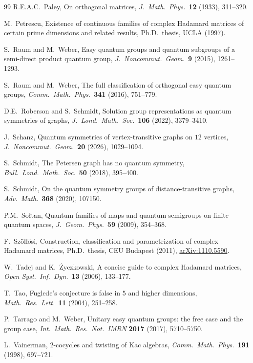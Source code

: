\documentclass[11pt]{amsart}
\theoremstyle{definition}
\theoremstyle{remark}
\theoremstyle{plain}
\numberwithin{equation}{section}
\numberwithin{table}{section}
\begin{document}
\begin{thebibliography}{99}
 R.E.A.C.~Paley, On orthogonal matrices, \emph{J.\ Math.\ Phys.}\ \textbf{12} (1933), 311--320.

 M.~Petrescu, Existence of continuous families of complex Hadamard matrices of certain prime dimensions and related results, Ph.D.\ thesis, UCLA (1997).

 S.~Raum and M.~Weber, Easy quantum groups and quantum subgroups of a semi-direct product quantum group, \emph{J.\ Noncommut.\ Geom.}\ \textbf{9} (2015), 1261--1293.

 S.~Raum and M.~Weber, The full classification of orthogonal easy quantum groups, \emph{Comm.\ Math.\ Phys.}\ \textbf{341} (2016), 751--779.

 D.E.~Roberson and S.~Schmidt, Solution group representations as quantum symmetries of graphs, \emph{J.\ Lond.\ Math.\ Soc.}\ \textbf{106} (2022), 3379--3410.

 J.~Schanz, Quantum symmetries of vertex-transitive graphs on $12$ vertices, \emph{J.\ Noncommut.\ Geom.}\ \textbf{20} (2026), 1029--1094.

 S.~Schmidt, The Petersen graph has no quantum symmetry, \emph{Bull.\ Lond.\ Math.\ Soc.}\ \textbf{50} (2018), 395--400.

 S.~Schmidt, On the quantum symmetry groups of distance-transitive graphs, \emph{Adv.\ Math.}\ \textbf{368} (2020), 107150.

 P.M.~So{\l}tan, Quantum families of maps and quantum semigroups on finite quantum spaces, \emph{J.\ Geom.\ Phys.}\ \textbf{59} (2009), 354--368.

 F.~Sz\"oll\H{o}si, Construction, classification and parametrization of complex Hadamard matrices, Ph.D.\ thesis, CEU Budapest (2011), \href{https://arxiv.org/pdf/1110.5590}{arXiv:1110.5590}.

 W.~Tadej and K.~\.{Z}yczkowski, A concise guide to complex Hadamard matrices, \emph{Open Syst.\ Inf.\ Dyn.}\ \textbf{13} (2006), 133--177.

 T.~Tao, Fuglede's conjecture is false in $5$ and higher dimensions, \emph{Math.\ Res.\ Lett.}\ \textbf{11} (2004), 251--258.

 P.~Tarrago and M.~Weber, Unitary easy quantum groups: the free case and the group case, \emph{Int.\ Math.\ Res.\ Not.\ IMRN} \textbf{2017} (2017), 5710--5750.

 L.~Vainerman, $2$-cocycles and twisting of Kac algebras, \emph{Comm.\ Math.\ Phys.}\ \textbf{191} (1998), 697--721.


\end{thebibliography}
\end{document}
